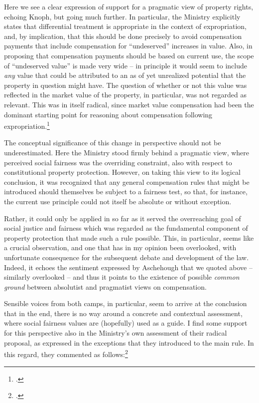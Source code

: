 Here we see a clear expression of support for a pragmatic view of property rights, echoing Knoph, but going much further. In particular, the Ministry explicitly states that differential treatment is appropriate in the context of expropriation, and, by implication, that this should be done precisely to avoid compensation payments that include compensation for ``undeserved'' increases in value. Also, in proposing that compensation payments should be based on current use, the scope of ``undeserved value'' is made very wide -- in principle it would seem to include \emph{any} value that could be attributed to an as of yet unrealized potential that the property in question might have. The question of whether or not this value was reflected in the market value of the property, in particular, was not regarded as relevant. This was in itself radical, since market value compensation had been the dominant starting point for reasoning about compensation following expropriation.\footcite[112-113]{nut69}

The conceptual significance of this change in perspective should not be underestimated. Here the Ministry stood firmly behind a pragmatic view, where perceived social fairness was the overriding constraint, also with respect to constitutional property protection. However, on taking this view to its logical conclusion, it was recognized that any general compensation rules that might be introduced should themselves be subject to a fairness test, so that, for instance, the current use principle could not itself be absolute or without exception. 

Rather, it could only be applied in so far as it served the overreaching goal of social justice and fairness which was regarded as the fundamental component of property protection that made such a rule possible. This, in particular, seems like a crucial observation, and one that has in my opinion been overlooked, with unfortunate consequence for the subsequent debate and development of the law. Indeed, it echoes the sentiment expressed by Aschehough that we quoted above -- similarly overlooked -- and thus it points to the existence of possible \emph{common ground} between absolutist and pragmatist views on compensation. 

Sensible voices from both camps, in particular, seem to arrive at the conclusion that in the end, there is no way around a concrete and contextual assessment, where social fairness values are (hopefully) used as a guide. I find some support for this perspective also in the Ministry's own assessment of their radical proposal, as expressed in the exceptions that they introduced to the main rule. In this regard, they commented as follows:\footcite[19]{otprp70}

